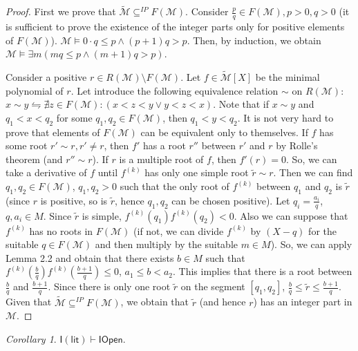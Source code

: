 \documentclass[a4paper,14pt]{article}
\theoremstyle{definition}
\theoremstyle{theorem}
\theoremstyle{lemma}
\theoremstyle{proposition}
\theoremstyle{remark}
\theoremstyle{corollary}
\newtheorem{corollary}{Corollary}
\theoremstyle{problem}
\theoremstyle{hypothesis}
\begin{document}
\begin{proof}
    First we prove that $\widetilde{\mathcal M} \subseteq^{IP} F(\mathcal M)$. Consider $\frac{p}{q} \in F(\mathcal M), p > 0, q > 0$ (it is sufficient to prove the existence of the integer parts only for positive elements of $F(\mathcal M)$). $\mathcal M \vDash 0\cdot q \leqslant p \wedge (p + 1)q > p$. Then, by induction, we obtain $\mathcal M \vDash \exists m (m q \leqslant p \wedge (m + 1)q > p)$.

    Consider a positive $r \in R(\mathcal M) \setminus F(\mathcal M)$. Let $f \in \widetilde{\mathcal{M}}[X]$ be the minimal polynomial of $r$. Let introduce the following equivalence relation $\sim$ on $R(\mathcal M)$: $x \sim y \leftrightharpoons \nexists z \in F(\mathcal M): (x < z < y \vee y < z < x)$. Note that if $x \sim y$ and $q_1 < x < q_2$ for some $q_1, q_2 \in F(\mathcal M)$, then $q_1 < y < q_2$. It is not very hard to prove that elements of $F(\mathcal M)$ can be equivalent only to themselves. If $f$ has some root $r' \sim r, r' \ne r$, then $f'$ has a root $r''$ between $r'$ and $r$ by Rolle's theorem (and $r'' \sim r$). If $r$ is a multiple root of $f$, then $f'(r) = 0$. So, we can take a derivative of $f$ until $f^{(k)}$ has only one simple root $\tilde r \sim r$. Then we can find $q_1, q_2 \in F(\mathcal M)$, $q_1, q_2 > 0$ such that the only root of $f^{(k)}$ between $q_1$ and $q_2$ is $\tilde r$ (since $r$ is positive, so is $\tilde r$, hence $q_1, q_2$ can be chosen positive). Let $q_i = \frac{a_i}{q}$, $q, a_i \in M$. Since $\tilde r$ is simple, $f^{(k)}(q_1) f^{(k)}(q_2) < 0$. Also we can suppose that $f^{(k)}$ has no roots in $F(\mathcal M)$ (if not, we can divide $f^{(k)}$ by $(X - q)$ for the suitable $q \in F(\mathcal M)$ and then multiply by the suitable $m \in M$). So, we can apply Lemma 2.2 and obtain that there exists $b \in M$ such that $f^{(k)}(\frac{b}{q}) f^{(k)}(\frac{b + 1}{q}) \leqslant 0$, $a_1 \leqslant b < a_2$. This implies that there is a root between $\frac{b}{q}$ and $\frac{b + 1}{q}$. Since there is only one root $\tilde r$ on the segment $[q_1, q_2]$, $\frac{b}{q} \leqslant \tilde r \leqslant \frac{b + 1}{q}$. Given that $\widetilde{\mathcal M} \subseteq^{IP} F(\mathcal M)$, we obtain that $\tilde r$ (and hence $r$) has an integer part in $\mathcal M$.
\end{proof}

\begin{corollary}
    $\mathsf{I(lit)} \vdash \mathsf{IOpen}$.
\end{corollary}
\end{document}
